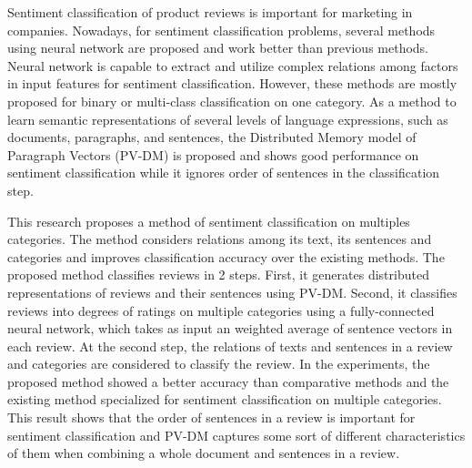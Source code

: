 Sentiment classification of product reviews is important
for marketing in companies.
%
Nowadays, for sentiment classification problems,
several methods using neural network are proposed
and work better than previous methods.
Neural network is capable to extract and utilize complex relations
among factors in input features for sentiment classification.
However, these methods are mostly proposed
for binary or multi-class classification on one category.
%
As a method to learn semantic representations of several levels
of language expressions, such as documents, paragraphs, and sentences,
the Distributed  Memory model of Paragraph Vectors (PV-DM) is proposed
and shows good performance on sentiment classification
while it ignores order of sentences in the classification step.

This research proposes a method of sentiment classification
on multiples categories.
The method considers relations among its text, its sentences and categories
and improves classification accuracy over the existing methods.
%
The proposed method classifies reviews in 2 steps.
First, it generates distributed representations of reviews
and their sentences using PV-DM.
Second, it classifies reviews into degrees of ratings
on multiple categories using a fully-connected neural network,
which takes as input an weighted average of
sentence vectors in each review.
At the second step, the relations of texts and sentences in a review
and categories are considered to classify the review.
%
In the experiments, the proposed method showed a better accuracy
than comparative methods and the existing method specialized
for sentiment classification on multiple categories.
This result shows that
the order of sentences in a review is important for sentiment classification
and PV-DM captures some sort of different characteristics of them
when combining a whole document and sentences in a review.
